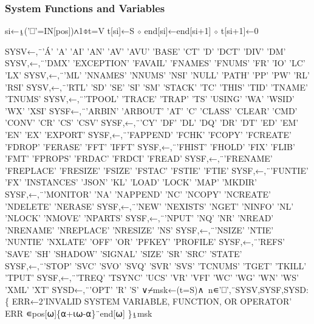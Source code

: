 \documentclass{article}%
\begin{document}
\subsubsection{System Functions and Variables}

\nwenddocs{}\endmoddef\nwstartdeflinemarkup{}\nwenddeflinemarkup
si←⍸('⎕'=IN[pos])∧1⌽t=V
t[si]←S ⋄ end[si]←end[si+1] ⋄ t[si+1]←0
\nwendcode{}\nwdocspar

\nwenddocs{}\endmoddef\nwstartdeflinemarkup{}\nwenddeflinemarkup
SYSV←,¨'Á' 'A' 'AI' 'AN' 'AV' 'AVU' 'BASE' 'CT' 'D' 'DCT' 'DIV' 'DM'
SYSV,←,¨'DMX' 'EXCEPTION' 'FAVAIL' 'FNAMES' 'FNUMS' 'FR' 'IO' 'LC' 'LX'
SYSV,←,¨'ML' 'NNAMES' 'NNUMS' 'NSI' 'NULL' 'PATH' 'PP' 'PW' 'RL' 'RSI'
SYSV,←,¨'RTL' 'SD' 'SE' 'SI' 'SM' 'STACK' 'TC' 'THIS' 'TID' 'TNAME' 'TNUMS'
SYSV,←,¨'TPOOL' 'TRACE' 'TRAP' 'TS' 'USING' 'WA' 'WSID' 'WX' 'XSI'
SYSF←,¨'ARBIN' 'ARBOUT' 'AT' 'C' 'CLASS' 'CLEAR' 'CMD' 'CONV' 'CR' 'CS' 'CSV'
SYSF,←,¨'CY' 'DF' 'DL' 'DQ' 'DR' 'DT' 'ED' 'EM' 'EN' 'EX' 'EXPORT'
SYSF,←,¨'FAPPEND' 'FCHK' 'FCOPY' 'FCREATE' 'FDROP' 'FERASE' 'FFT' 'IFFT'
SYSF,←,¨'FHIST' 'FHOLD' 'FIX' 'FLIB' 'FMT' 'FPROPS' 'FRDAC' 'FRDCI' 'FREAD'
SYSF,←,¨'FRENAME' 'FREPLACE' 'FRESIZE' 'FSIZE' 'FSTAC' 'FSTIE' 'FTIE'
SYSF,←,¨'FUNTIE' 'FX' 'INSTANCES' 'JSON' 'KL' 'LOAD' 'LOCK' 'MAP' 'MKDIR'
SYSF,←,¨'MONITOR' 'NA' 'NAPPEND' 'NC' 'NCOPY' 'NCREATE' 'NDELETE' 'NERASE'
SYSF,←,¨'NEW' 'NEXISTS' 'NGET' 'NINFO' 'NL' 'NLOCK' 'NMOVE' 'NPARTS'
SYSF,←,¨'NPUT' 'NQ' 'NR' 'NREAD' 'NRENAME' 'NREPLACE' 'NRESIZE' 'NS'
SYSF,←,¨'NSIZE' 'NTIE' 'NUNTIE' 'NXLATE' 'OFF' 'OR' 'PFKEY' 'PROFILE'
SYSF,←,¨'REFS' 'SAVE' 'SH' 'SHADOW' 'SIGNAL' 'SIZE' 'SR' 'SRC' 'STATE'
SYSF,←,¨'STOP' 'SVC' 'SVO' 'SVQ' 'SVR' 'SVS' 'TCNUMS' 'TGET' 'TKILL' 'TPUT'
SYSF,←,¨'TREQ' 'TSYNC' 'UCS' 'VR' 'VFI' 'WC' 'WG' 'WN' 'WS' 'XML' 'XT'
SYSD←,¨'OPT' 'R' 'S'
∨⌿msk←(t=S)∧~n∊'⎕',¨SYSV,SYSF,SYSD:\{
        ERR←2'INVALID SYSTEM VARIABLE, FUNCTION, OR OPERATOR'
        ERR ∊pos[⍵]\{⍺+⍳⍵-⍺\}¨end[⍵]
\}⍸msk
\nwendcode{}\nwdocspar
\end{document}
